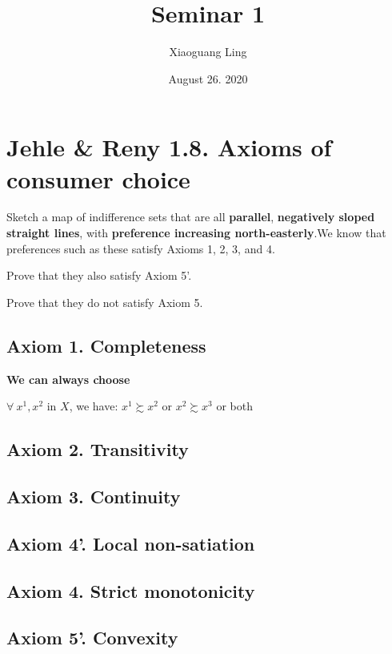 \documentclass{article}
\title{Seminar 1}
\author{Xiaoguang Ling }
\date{August 26. 2020}
\begin{document}
\maketitle


\section{Jehle \& Reny 1.8. Axioms of consumer choice}

Sketch a map of indifference sets that are all \textbf{parallel}, \textbf{negatively sloped 
straight lines}, with \textbf{preference increasing north-easterly}.We know that preferences 
such as these satisfy Axioms 1, 2, 3, and 4. 

Prove that they also satisfy Axiom 5'. 

Prove that they do not satisfy Axiom 5.

\subsection{Axiom 1. Completeness}
\textbf{We can always choose}

$\forall \ x^1, x^2$ in $X$, we have: $x^1 \succsim  x^2$ or $x^2 \succsim  x^3$  or both

\subsection{Axiom 2. Transitivity}


\subsection{Axiom 3. Continuity}


\subsection{Axiom 4'. Local non-satiation}

\subsection{Axiom 4. Strict monotonicity}

\subsection{Axiom 5'. Convexity}
\end{document}
